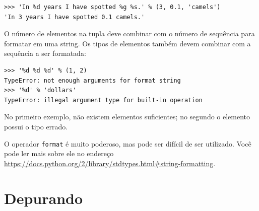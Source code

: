 {\beforeverb
\begin{verbatim}
>>> 'In %d years I have spotted %g %s.' % (3, 0.1, 'camels')
'In 3 years I have spotted 0.1 camels.'
\end{verbatim}
\afterverb
%
%
O número de elementos na tupla deve combinar com o número de sequência
para formatar em uma string. Os tipos de elementos também devem combinar
com a sequência a ser formatada:


\beforeverb
\begin{verbatim}
>>> '%d %d %d' % (1, 2)
TypeError: not enough arguments for format string
>>> '%d' % 'dollars'
TypeError: illegal argument type for built-in operation
\end{verbatim}
\afterverb
%
%
No primeiro exemplo, não existem elementos suficientes; no segundo o elemento
possui o tipo errado.


O operador {\tt format} é muito poderoso, mas pode ser difícil de ser
utilizado. Você pode ler mais sobre ele no endereço
\url{https://docs.python.org/2/library/stdtypes.html#string-formatting}.



\section{Depurando}

}
